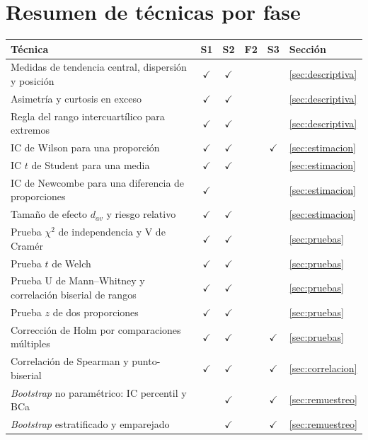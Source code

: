 \documentclass[11pt,a4paper]{article}
\begin{document}
\section*{Resumen de técnicas por fase}
{\small\setlength{\tabcolsep}{4pt}
\begin{longtable}{@{}p{7.3cm} c c c c p{3.6cm}@{}}
\toprule
Técnica & S1 & S2 & F2 & S3 & Sección\\\midrule\endhead
Medidas de tendencia central, dispersión y posición & $\checkmark$ & $\checkmark$ & & & \ref{sec:descriptiva}\\
Asimetría y curtosis en exceso & $\checkmark$ & $\checkmark$ & & & \ref{sec:descriptiva}\\
Regla del rango intercuartílico para extremos & $\checkmark$ & $\checkmark$ & & & \ref{sec:descriptiva}\\
IC de Wilson para una proporción & $\checkmark$ & $\checkmark$ & & $\checkmark$ & \ref{sec:estimacion}\\
IC $t$ de Student para una media & $\checkmark$ & $\checkmark$ & & & \ref{sec:estimacion}\\
IC de Newcombe para una diferencia de proporciones & $\checkmark$ & & & & \ref{sec:estimacion}\\
Tamaño de efecto $d_{av}$ y riesgo relativo & $\checkmark$ & $\checkmark$ & & & \ref{sec:estimacion}\\
Prueba $\chi^2$ de independencia y V de Cramér & $\checkmark$ & $\checkmark$ & & & \ref{sec:pruebas}\\
Prueba $t$ de Welch & $\checkmark$ & $\checkmark$ & & & \ref{sec:pruebas}\\
Prueba U de Mann--Whitney y correlación biserial de rangos & $\checkmark$ & $\checkmark$ & & & \ref{sec:pruebas}\\
Prueba $z$ de dos proporciones & $\checkmark$ & $\checkmark$ & & & \ref{sec:pruebas}\\
Corrección de Holm por comparaciones múltiples & $\checkmark$ & $\checkmark$ & & $\checkmark$ & \ref{sec:pruebas}\\
Correlación de Spearman y punto-biserial & $\checkmark$ & $\checkmark$ & & $\checkmark$ & \ref{sec:correlacion}\\
\emph{Bootstrap} no paramétrico: IC percentil y BCa & & $\checkmark$ & & $\checkmark$ & \ref{sec:remuestreo}\\
\emph{Bootstrap} estratificado y emparejado & & $\checkmark$ & & $\checkmark$ & \ref{sec:remuestreo}\\

\end{longtable}}
\end{document}
